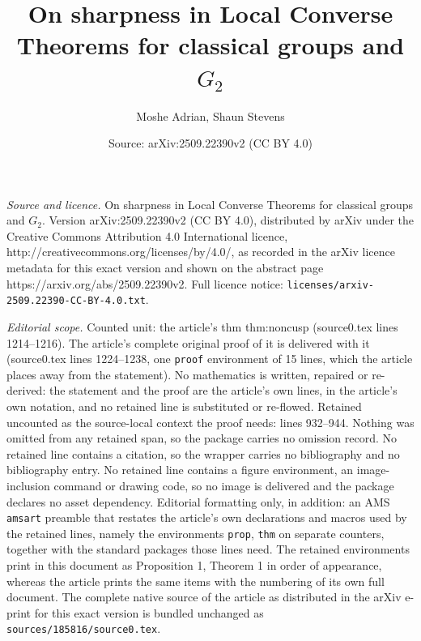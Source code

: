 \documentclass[10pt,a4paper]{amsart}
\title{On sharpness in Local Converse Theorems for classical groups and $G_2$}
\author{Moshe Adrian, Shaun Stevens}
\date{Source: arXiv:2509.22390v2 (CC BY 4.0)}
\begin{document}
\maketitle

\noindent\emph{Source and licence.} On sharpness in Local Converse Theorems for classical groups and $G_2$. Version arXiv:2509.22390v2 (CC BY 4.0), distributed by arXiv under the Creative Commons Attribution 4.0 International licence, http://creativecommons.org/licenses/by/4.0/, as recorded in the arXiv licence metadata for this exact version and shown on the abstract page https://arxiv.org/abs/2509.22390v2. Full licence notice: \texttt{licenses/arxiv-2509.22390-CC-BY-4.0.txt}.\par\smallskip

\noindent\textit{Editorial scope.} Counted unit: the article's thm thm:noncusp (source0.tex lines 1214--1216). The article's complete original proof of it is delivered with it (source0.tex lines 1224--1238, one \texttt{proof} environment of 15 lines, which the article places away from the statement). No mathematics is written, repaired or re-derived: the statement and the proof are the article's own lines, in the article's own notation, and no retained line is substituted or re-flowed.  Retained uncounted as the source-local context the proof needs: lines 932--944.  Nothing was omitted from any retained span, so the package carries no omission record.  No retained line contains a citation, so the wrapper carries no bibliography and no bibliography entry.  No retained line contains a figure environment, an image-inclusion command or drawing code, so no image is delivered and the package declares no asset dependency.  Editorial formatting only, in addition: an AMS \texttt{amsart} preamble that restates the article's own declarations and macros used by the retained lines, namely the environments \texttt{prop}, \texttt{thm} on separate counters, together with the standard packages those lines need.  The retained environments print in this document as Proposition 1, Theorem 1 in order of appearance, whereas the article prints the same items with the numbering of its own full document.  The complete native source of the article as distributed in the arXiv e-print for this exact version is bundled unchanged as \texttt{sources/185816/source0.tex}.
\end{document}
